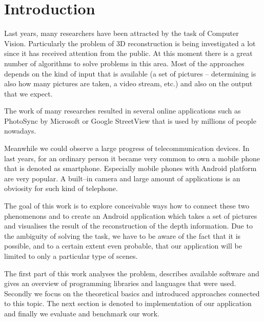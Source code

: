 \chapter*{Introduction}
Last years, many researchers have been attracted by the task of Computer Vision. 
Particularly the problem of 3D reconstruction is being investigated a lot since it has 
received attention from the public. At this moment there is a great number of 
algorithms to solve problems in this area. Most of the approaches depends on 
the kind of input that is available (a set of pictures – determining is also how many pictures are taken, 
a video stream, etc.) and also on the output that we expect.

The work of many researches resulted in several online applications such as PhotoSync by Microsoft or 
Google StreetView that is used by millions of people nowadays.

Meanwhile we could observe a large progress of telecommunication devices. 
In last years, for an ordinary person it became very common to own a mobile phone 
that is denoted as smartphone. Especially mobile phones with Android platform are very popular. 
A built–in camera and large amount of applications is an obviosity for such kind 
of telephone.

The goal of this work is to explore conceivable ways how to connect these two 
phenomenons and to create an Android application which takes a set of pictures and 
visualises the result of the reconstruction of the depth information. Due to the 
ambiguity of solving the task, we have to be aware of the fact that it is possible,
and to a certain extent even probable, that our application will be limited to only a particular
type of scenes. 

The first part of this work analyses the problem, describes available software and gives an 
overview of programming libraries and languages that were used. 
Secondly we focus on the theoretical basics and introduced approaches connected to this topic.
The next section is denoted to implementation of our application and finally we evaluate and benchmark 
our work.

